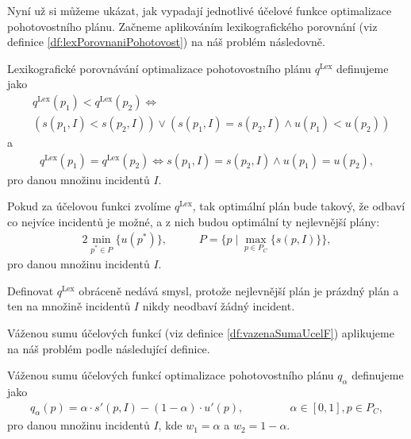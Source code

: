 Nyní už si můžeme ukázat, jak vypadají jednotlivé účelové funkce optimalizace pohotovostního plánu.
Začneme aplikováním lexikografického porovnání (viz definice \ref{df:lexPorovnaniPohotovost}) na náš problém následovně.
\begin{definice}\label{df:lexPorovnaniPohotovost}
  Lexikografické porovnávání optimalizace pohotovostního plánu $q^{\text{Lex}}$ definujeme jako
  \begin{align*}
    & q^{\text{Lex}}(p_1) < q^{\text{Lex}}(p_2)\Leftrightarrow\\
    & ( s(p_1, I) < s(p_2, I)) \lor (s(p_1, I) = s(p_2, I) \land u(p_1) < u(p_2))
  \end{align*}
  a 
  \begin{align*}
    q^{\text{Lex}}(p_1) = q^{\text{Lex}}(p_2) \Leftrightarrow s(p_1, I) = s(p_2, I) \land u(p_1) = u(p_2),
  \end{align*}
  pro danou množinu incidentů $I$.
\end{definice}

Pokud za účelovou funkci zvolíme $q^{\text{Lex}}$, tak optimální plán bude takový, že odbaví co nejvíce incidentů je možné, a z nich budou optimální ty nejlevnější plány:
\begin{alignat*}{2}
  \min_{p^* \in P} \{ u(p^*) \}, && \hspace{15pt} P = \{ p \mid \max_{p \in P_C} \{ s(p, I) \} \},
\end{alignat*}
pro danou množinu incidentů $I$.

Definovat $q^{\text{Lex}}$ obráceně nedává smysl, protože nejlevnější plán je prázdný plán a ten na množině incidentů $I$ nikdy neodbaví žádný incident.

Váženou sumu účelových funkcí (viz definice \ref{df:vazenaSumaUcelF}) aplikujeme na náš problém podle následující definice. 
\begin{definice}\label{df:vazenaSumaPohotovost}
  Váženou sumu účelových funkcí optimalizace pohotovostního plánu $q_{\alpha}$ definujeme jako
  \begin{align*}
    q_{\alpha}(p) = \alpha \cdot s'(p, I) - (1 - \alpha) \cdot u'(p), \hspace{50pt} \alpha \in [0, 1], p \in P_C,
  \end{align*}
  pro danou množinu incidentů $I$, kde $w_1 = \alpha$ a $w_2 = 1 - \alpha$.
\end{definice}

